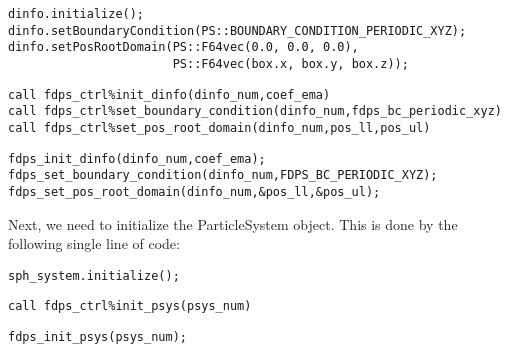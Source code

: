 \ifCpp %
\begin{lstlisting}[caption=Initialization of DomainInfo object]
dinfo.initialize();
dinfo.setBoundaryCondition(PS::BOUNDARY_CONDITION_PERIODIC_XYZ);
dinfo.setPosRootDomain(PS::F64vec(0.0, 0.0, 0.0),
                       PS::F64vec(box.x, box.y, box.z));
\end{lstlisting}
\endifCpp
\ifFtn %
\begin{lstlisting}[caption=Initialization of DomainInfo object]
call fdps_ctrl%init_dinfo(dinfo_num,coef_ema)
call fdps_ctrl%set_boundary_condition(dinfo_num,fdps_bc_periodic_xyz)
call fdps_ctrl%set_pos_root_domain(dinfo_num,pos_ll,pos_ul)
\end{lstlisting}
\endifFtn
\ifC %
\begin{lstlisting}[caption=Initialization of DomainInfo object]
fdps_init_dinfo(dinfo_num,coef_ema);
fdps_set_boundary_condition(dinfo_num,FDPS_BC_PERIODIC_XYZ);
fdps_set_pos_root_domain(dinfo_num,&pos_ll,&pos_ul);
\end{lstlisting}
\endifC


Next, we need to initialize the \textsf{ParticleSystem} object. This is done by the following single line of code:

\ifCpp %
\begin{lstlisting}[caption=Initialization of ParticleSystem object]
sph_system.initialize();
\end{lstlisting}
\endifCpp
\ifFtn %
\begin{lstlisting}[caption=Initialization of ParticleSystem object]
call fdps_ctrl%init_psys(psys_num)
\end{lstlisting}
\endifFtn
\ifC %
\begin{lstlisting}[caption=Initialization of ParticleSystem object]
fdps_init_psys(psys_num);
\end{lstlisting}
\endifC



